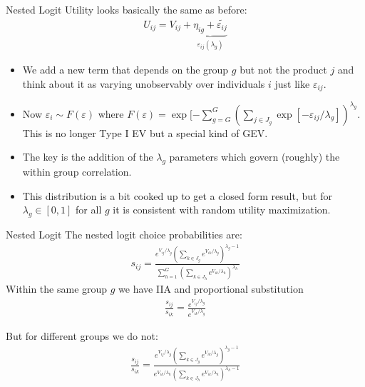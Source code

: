 \begin{frame}{Nested Logit}
Utility looks basically the same as before:
\begin{eqnarray*}
U_{ij} = V_{ij} + \underbrace{\eta_{ig} + \widetilde{\varepsilon_{ij}}}_{\varepsilon_{ij}(\lambda_g)}
\end{eqnarray*}
\begin{itemize}
\item We add a new term that depends on the group $g$ but not the product $j$ and think about it as varying unobservably over individuals $i$ just like $\varepsilon_{ij}$.
\item Now $\varepsilon_i \sim F(\varepsilon)$ where $F(\varepsilon) = \exp[-\sum_{g=G}^G \left(\sum_{j \in J_g} \exp[-\varepsilon_{ij}/\lambda_g]\right)^{\lambda_g}$. This is no longer Type I EV but a special kind of GEV.
\item The key is the addition of the $\lambda_g$ parameters which govern (roughly) the within group correlation.
\item This distribution is a bit cooked up to get a closed form result, but for $\lambda_g \in [0,1]$ for all $g$ it is consistent with random utility maximization.
\end{itemize}
\end{frame}

\begin{frame}{Nested Logit}
\small
The nested logit choice probabilities are:
\begin{eqnarray*}
s_{ij} = \frac{ e^{V_{ij}/\lambda_g} \left(\sum_{k \in J_g} e^{V_{ik}/\lambda_g} \right)^{\lambda_g -1}}{\sum_{h=1}^G \left(\sum_{k \in J_h} e^{V_{ik}/\lambda_h} \right)^{\lambda_h}}
\end{eqnarray*}
Within the same group $g$ we have IIA and proportional substitution
\begin{eqnarray*}
\frac{s_{ij}}{s_{ik}} = \frac{ e^{V_{ij}/\lambda_g}}{ e^{V_{ik}/\lambda_g}}
\end{eqnarray*}

But for different groups we do not:
\begin{eqnarray*}
\frac{s_{ij}}{s_{ik}} = \frac{ e^{V_{ij}/\lambda_g} \left(\sum_{k \in J_g} e^{V_{ik}/\lambda_g} \right)^{\lambda_g -1}}{ e^{V_{ik}/\lambda_h} \left(\sum_{k \in J_h} e^{V_{ik}/\lambda_h} \right)^{\lambda_h -1}}
\end{eqnarray*}
\end{frame}


